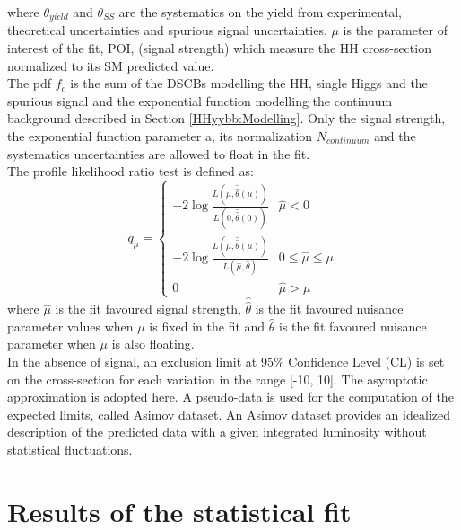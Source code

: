 where $\theta_{yield}$ and $\theta_{SS}$ are the systematics on the yield from experimental, theoretical uncertainties and spurious signal uncertainties. $\mu$ is the parameter of interest of the fit, POI, (signal strength) which measure the HH cross-section normalized to its SM predicted value. \\
The pdf $f_c$ is the sum of the DSCBs modelling the HH, single Higgs and the spurious signal and the exponential function modelling the continuum background described in Section \ref{HHyybb:Modelling}. Only the signal strength, the exponential function parameter a, its normalization $N_{continuum}$ and the systematics uncertainties are allowed to float in the fit. \\
The profile likelihood ratio test is defined as: 
\begin{equation}
    \tilde{q}_{\mu}=\left\{\begin{array}{ll}
-2 \log \frac{L(\mu, \hat{\hat{\theta}}({\mu}))}{L(0, \hat{\hat{\theta}}(0))} & \hat{\mu}<0 \\
-2 \log \frac{L(\mu, \hat{\hat{\theta}}({\mu}))}{L(\hat{\mu}, \hat{\theta})} & 0 \leq \hat{\mu} \leq \mu \\
0 & \hat{\mu}>\mu
\end{array}\right.
\end{equation}
where $\hat{\mu}$ is the fit favoured signal strength, $\hat{\hat{\theta}}$ is the fit favoured nuisance parameter values when $\mu$ is fixed in the fit and $\hat{\theta}$ is the fit favoured nuisance parameter when $\mu$ is also floating. \\
In the absence of signal, an exclusion limit at 95\% Confidence Level (CL) is set on the \HHyybb cross-section for each \kl variation in the range [-10, 10]. The asymptotic approximation \cite{Z} is adopted here. A pseudo-data is used for the computation of the expected limits, called Asimov dataset. An Asimov dataset provides an idealized description of the predicted data with a given integrated luminosity without statistical fluctuations.

\section{Results of the statistical fit}
\label{HHyybb:Results}

